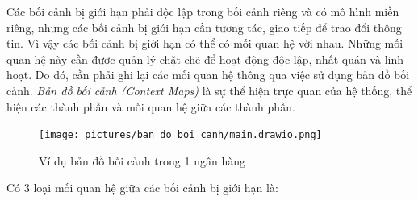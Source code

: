 






Các bối cảnh bị giới hạn phải độc lập trong bối cảnh riêng và có mô hình miền riêng, nhưng các bối cảnh bị giới hạn cần tương tác, giao tiếp để trao đổi thông tin. Vì vậy các bối cảnh bị giới hạn có thể có mối quan hệ với nhau. Những mối quan hệ này cần được quản lý chặt chẽ để hoạt động độc lập, nhất quán và linh hoạt. Do đó, cần phải ghi lại các mối quan hệ thông qua việc sử dụng bản đồ bối cảnh. \emph{Bản đồ bối cảnh (Context Maps)} là sự thể hiện trực quan của hệ thống, thể hiện các thành phần và mối quan hệ giữa các thành phần.

\begin{figure}[H]

    \centering

    \texttt{[image: pictures/ban\_do\_boi\_canh/main.drawio.png]}

    \caption{Ví dụ bản đồ bối cảnh trong 1 ngân hàng}

\end{figure}












Có 3 loại mối quan hệ giữa các bối cảnh bị giới hạn là:

